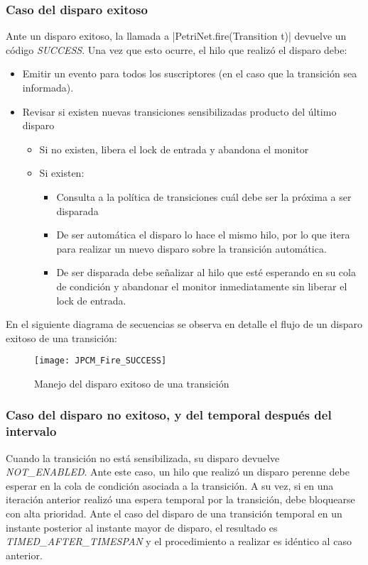 \subsubsection*{Caso del disparo exitoso}
Ante un disparo exitoso, la llamada a |PetriNet.fire(Transition t)|
devuelve un código \textit{SUCCESS}. Una vez que esto ocurre, el hilo que
realizó el disparo debe:
\begin{itemize}
  \item Emitir un evento para todos los suscriptores (en el caso que la
  transición sea informada).
  \item Revisar si existen nuevas transiciones sensibilizadas producto del
  último disparo
      \begin{itemize}
        \item Si no existen, libera el lock de entrada y abandona el monitor
        \item Si existen:
            \begin{itemize}
                \item Consulta a la política de transiciones cuál debe ser la próxima a ser disparada
                \item De ser automática el disparo lo hace el mismo hilo, por lo que
                itera para realizar un nuevo disparo sobre la transición automática.
                \item De ser disparada debe señalizar al hilo que esté esperando en su
                cola de condición y abandonar el monitor inmediatamente sin liberar el
                lock de entrada.
            \end{itemize}
      \end{itemize}
\end{itemize}

En el siguiente diagrama de secuencias se observa en detalle el flujo de un
disparo exitoso de una transición:

\begin{figure}[H]
  \centering
  \texttt{[image: JPCM\_Fire\_SUCCESS]}
  \caption{Manejo del disparo exitoso de una transición}
  \label{fig:JPCM_Fire_SUCCESS}
\end{figure}

\subsubsection*{Caso del disparo no exitoso, y del temporal después del
intervalo}

Cuando la transición no está sensibilizada, su disparo devuelve
\textit{NOT\_ENABLED}. Ante este caso, un hilo que realizó un disparo perenne
debe esperar en la cola de condición asociada a la transición. A su vez, si en
una iteración anterior realizó una espera temporal por la transición, debe
bloquearse con alta prioridad.
Ante el caso del disparo de una transición temporal en un instante posterior al
instante mayor de disparo, el resultado es \textit{TIMED\_AFTER\_TIMESPAN} y el
procedimiento a realizar es idéntico al caso anterior.
 
